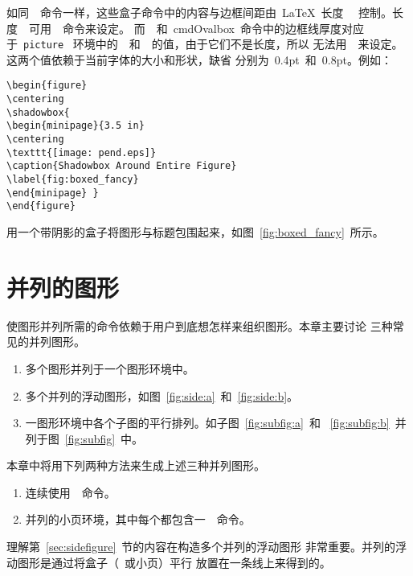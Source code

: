 如同~~命令一样，这些盒子命令中的内容与边框间距由~\LaTeX{}~长度
~~控制。长度~~可用~~命令来设定。
而~~和~cmd{Ovalbox}~命令中的边框线厚度对应于~\texttt{picture}~
环境中的~~和~~的值，由于它们不是长度，所以
无法用~~来设定。这两个值依赖于当前字体的大小和形状，缺省
分别为~0.4pt~和~0.8pt。例如：
\begin{Verbatim}[xleftmargin=1cm]
\begin{figure} 
\centering 
\shadowbox{ 
\begin{minipage}{3.5 in} 
\centering 
\texttt{[image: pend.eps]} 
\caption{Shadowbox Around Entire Figure} 
\label{fig:boxed_fancy} 
\end{minipage} } 
\end{figure}
\end{Verbatim}
用一个带阴影的盒子将图形与标题包围起来，如图~\ref{fig:boxed_fancy}~所示。

\begin{figure} 
	\centering 
\end{figure}

\section{并列的图形}\label{sec:sidebyside}

使图形并列所需的命令依赖于用户到底想怎样来组织图形。本章主要讨论
三种常见的并列图形。
\begin{enumerate}
	\item 多个图形并列于一个图形环境中。
	\item 多个并列的浮动图形，如图~\ref{fig:side:a}~和~\ref{fig:side:b}。
	\item 一图形环境中各个子图的平行排列。如子图~\ref{fig:subfig:a}~和
	~\ref{fig:subfig:b}~并列于图~\ref{fig:subfig}~中。
\end{enumerate}

本章中将用下列两种方法来生成上述三种并列图形。
\begin{enumerate}
	\item 连续使用~~命令。
	\item 并列的小页环境，其中每个都包含一~~命令。
\end{enumerate}
理解第~\ref{sec:sidefigure}~节的内容在构造多个并列的浮动图形
非常重要。并列的浮动图形是通过将盒子（~或小页）平行
放置在一条线上来得到的。

